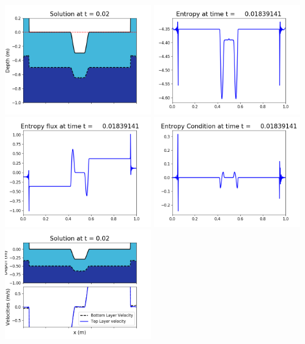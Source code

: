 \documentclass[11pt]{article}
\begin{document}
\includegraphics[width=0.475\textwidth]{frame0043fig1006.png}
\vskip 10pt 
\includegraphics[width=0.475\textwidth]{frame0043fig1007.png}
\includegraphics[width=0.475\textwidth]{frame0043fig1008.png}
\vskip 10pt 
\includegraphics[width=0.475\textwidth]{frame0043fig1009.png}
\vskip 10pt 
\includegraphics[width=0.475\textwidth]{frame0044fig1001.png}
\end{document}

